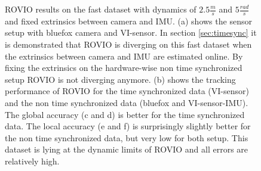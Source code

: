 \begin{figure}[h]
\begin{subfigure}[b]{0.42\textwidth}
    \caption{}
  \end{subfigure}
   \caption{ROVIO results on the fast dataset with dynamics of $2.5\frac{m}{s}$ and $5\frac{rad}{s}$ and fixed extrinsics between camera and IMU. (a) shows the sensor setup with bluefox camera and VI-sensor. In section \ref{sec:timesync} it is demonstrated that ROVIO is diverging on this fast dataset when the extrinsics between camera and IMU are estimated online. By fixing the extrinsics on the hardware-wise non time synchronized setup ROVIO is not diverging anymore. (b) shows the tracking performance of ROVIO for the time synchronized data (VI-sensor) and the non time synchronized data (bluefox and VI-sensor-IMU). The global accuracy (c and d) is better for the time synchronized data. The local accuracy (e and f) is surprisingly slightly better for the non time synchronized data, but very low for both setup. This dataset is lying at the dynamic limits of ROVIO and all errors are relatively high.}
   \label{pics:appendix_fast}
\end{figure}